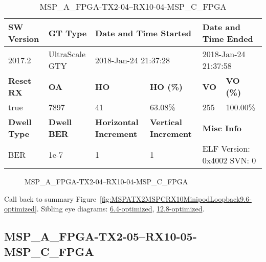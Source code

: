 \begin{table}[h]
\centering
\caption{MSP\_A\_FPGA-TX2-04--RX10-04-MSP\_C\_FPGA}
\label{tab:MSPAFPGATX204RX1004MSPCFPGA9.6-optimized}
\begin{tabular}{@{}|l|l|l|l|l|l|@{}}
\toprule
\textbf{SW Version}                & \textbf{GT Type}   & \multicolumn{2}{l|}{\textbf{Date and Time Started}}            & \multicolumn{2}{l|}{\textbf{Date and Time Ended}}        \\ \midrule
2017.2                       & UltraScale GTY          & \multicolumn{2}{l|}{2018-Jan-24 21:37:28}                   & \multicolumn{2}{l|}{2018-Jan-24 21:37:58}               \\ \midrule
\textbf{Reset RX}                  & \textbf{OA} & \textbf{HO}   & \textbf{HO (\%)} & \textbf{VO} & \textbf{VO (\%)} \\ \midrule
true & 7897        & 41          & 63.08\%        & 255        & 100.00\%       \\ \midrule
\textbf{Dwell Type}                & \textbf{Dwell BER} & \textbf{Horizontal Increment} & \textbf{Vertical Increment}    & \multicolumn{2}{l|}{\textbf{Misc Info}}                  \\ \midrule
BER                            & 1e-7        & 1        & 1           & \multicolumn{2}{l|}{ELF Version: 0x4002 SVN: 0}                         \\ \bottomrule
\end{tabular}
\end{table}

\begin{figure}[h]
\caption{MSP\_A\_FPGA-TX2-04--RX10-04-MSP\_C\_FPGA} \label{fig:MSPAFPGATX204RX1004MSPCFPGA9.6-optimized}
\end{figure}

Call back to summary Figure~\ref{fig:MSPATX2MSPCRX10MinipodLoopback9.6-optimized}.
Sibling eye diagrams: \hyperref[sec:MSPAFPGATX204RX1004MSPCFPGA6.4-optimized]{6.4-optimized}, \hyperref[sec:MSPAFPGATX204RX1004MSPCFPGA12.8-optimized]{12.8-optimized}.

\clearpage
\newpage


\subsection{MSP\_A\_FPGA-TX2-05--RX10-05-MSP\_C\_FPGA}\label{sec:MSPAFPGATX205RX1005MSPCFPGA9.6-optimized}

